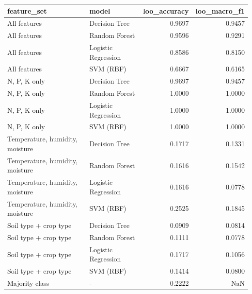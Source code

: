 \begin{tabular}{llrr}
\toprule
feature_set & model & loo_accuracy & loo_macro_f1 \\
\midrule
All features & Decision Tree & 0.9697 & 0.9457 \\
All features & Random Forest & 0.9596 & 0.9291 \\
All features & Logistic Regression & 0.8586 & 0.8150 \\
All features & SVM (RBF) & 0.6667 & 0.6165 \\
N, P, K only & Decision Tree & 0.9697 & 0.9457 \\
N, P, K only & Random Forest & 1.0000 & 1.0000 \\
N, P, K only & Logistic Regression & 1.0000 & 1.0000 \\
N, P, K only & SVM (RBF) & 1.0000 & 1.0000 \\
Temperature, humidity, moisture & Decision Tree & 0.1717 & 0.1331 \\
Temperature, humidity, moisture & Random Forest & 0.1616 & 0.1542 \\
Temperature, humidity, moisture & Logistic Regression & 0.1616 & 0.0778 \\
Temperature, humidity, moisture & SVM (RBF) & 0.2525 & 0.1845 \\
Soil type + crop type & Decision Tree & 0.0909 & 0.0814 \\
Soil type + crop type & Random Forest & 0.1111 & 0.0778 \\
Soil type + crop type & Logistic Regression & 0.1717 & 0.1056 \\
Soil type + crop type & SVM (RBF) & 0.1414 & 0.0800 \\
Majority class & - & 0.2222 & NaN \\
\bottomrule
\end{tabular}

